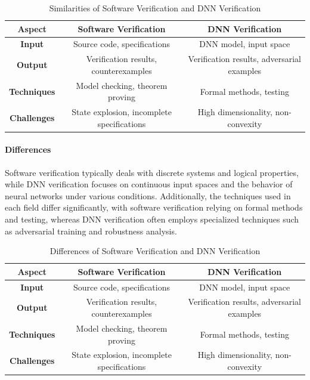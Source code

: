 \documentclass[oneside,11pt,dvipsnames]{book}
\numberwithin{equation}{section}
\theoremstyle{definition}
\theoremstyle{remark}
\begin{document}
\begin{table}
\caption{Similarities of Software Verification and DNN Verification}
\begin{tabular}{|c|c|c|}
    \hline
    \textbf{Aspect} & \textbf{Software Verification} & \textbf{DNN Verification} \\
    \hline
    \textbf{Input} & Source code, specifications & DNN model, input space \\
    \hline
    \textbf{Output} & Verification results, counterexamples & Verification results, adversarial examples \\
    \hline
    \textbf{Techniques} & Model checking, theorem proving & Formal methods, testing \\
    \hline
    \textbf{Challenges} & State explosion, incomplete specifications & High dimensionality, non-convexity \\
    \hline
\end{tabular}
\end{table}


\paragraph{Differences}
Software verification typically deals with discrete systems and logical properties, while DNN verification focuses on continuous input spaces and the behavior of neural networks under various conditions. Additionally, the techniques used in each field differ significantly, with software verification relying on formal methods and testing, whereas DNN verification often employs specialized techniques such as adversarial training and robustness analysis.

\begin{table}
\caption{Differences of Software Verification and DNN Verification}
\begin{tabular}{|c|c|c|}
    \hline
    \textbf{Aspect} & \textbf{Software Verification} & \textbf{DNN Verification} \\
    \hline
    \textbf{Input} & Source code, specifications & DNN model, input space \\
    \hline
    \textbf{Output} & Verification results, counterexamples & Verification results, adversarial examples \\
    \hline
    \textbf{Techniques} & Model checking, theorem proving & Formal methods, testing \\
    \hline
    \textbf{Challenges} & State explosion, incomplete specifications & High dimensionality, non-convexity \\
    \hline
\end{tabular}
\end{table}
\end{document}
